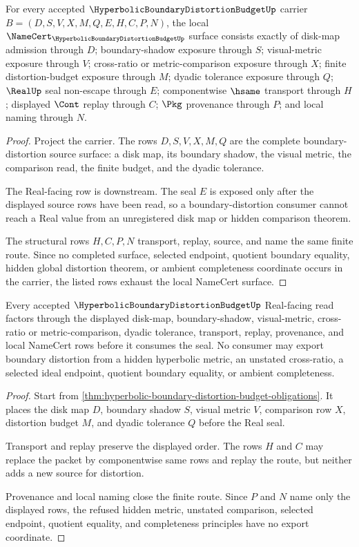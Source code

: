 \begin{theorem}
\label{thm:hyperbolic-boundary-distortion-budget-obligations}
For every accepted $\HyperbolicBoundaryDistortionBudgetUp$ carrier $B=(D,S,V,X,M,Q,E,H,C,P,N)$, the local $\NameCert_{\HyperbolicBoundaryDistortionBudgetUp}$ surface consists exactly of disk-map admission through $D$; boundary-shadow exposure through $S$; visual-metric exposure through $V$; cross-ratio or metric-comparison exposure through $X$; finite distortion-budget exposure through $M$; dyadic tolerance exposure through $Q$; $\RealUp$ seal non-escape through $E$; componentwise $\hsame$ transport through $H$; displayed $\Cont$ replay through $C$; $\Pkg$ provenance through $P$; and local naming through $N$.
\end{theorem}
\begin{proof}
Project the carrier. The rows $D,S,V,X,M,Q$ are the complete boundary-distortion source surface: a disk map, its boundary shadow, the visual metric, the comparison read, the finite budget, and the dyadic tolerance.

The Real-facing row is downstream. The seal $E$ is exposed only after the displayed source rows have been read, so a boundary-distortion consumer cannot reach a Real value from an unregistered disk map or hidden comparison theorem.

The structural rows $H,C,P,N$ transport, replay, source, and name the same finite route. Since no completed surface, selected endpoint, quotient boundary equality, hidden global distortion theorem, or ambient completeness coordinate occurs in the carrier, the listed rows exhaust the local NameCert surface.
\end{proof}

\begin{theorem}
\label{thm:hyperbolic-boundary-distortion-budget-nonescape}
Every accepted $\HyperbolicBoundaryDistortionBudgetUp$ Real-facing read factors through the displayed disk-map, boundary-shadow, visual-metric, cross-ratio or metric-comparison, dyadic tolerance, transport, replay, provenance, and local NameCert rows before it consumes the seal. No consumer may export boundary distortion from a hidden hyperbolic metric, an unstated cross-ratio, a selected ideal endpoint, quotient boundary equality, or ambient completeness.
\end{theorem}
\begin{proof}
Start from \autoref{thm:hyperbolic-boundary-distortion-budget-obligations}. It places the disk map $D$, boundary shadow $S$, visual metric $V$, comparison row $X$, distortion budget $M$, and dyadic tolerance $Q$ before the Real seal.

Transport and replay preserve the displayed order. The rows $H$ and $C$ may replace the packet by componentwise same rows and replay the route, but neither adds a new source for distortion.

Provenance and local naming close the finite route. Since $P$ and $N$ name only the displayed rows, the refused hidden metric, unstated comparison, selected endpoint, quotient equality, and completeness principles have no export coordinate.
\end{proof}

